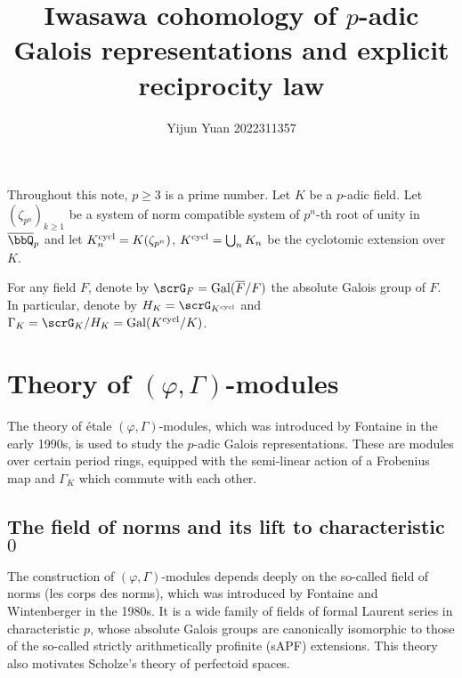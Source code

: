 \documentclass[a4paper,oneside]{amsart}
\title{Iwasawa cohomology of $p$-adic Galois representations and explicit reciprocity law}
\author{Yijun Yuan\textsuperscript{\orcidlink{0000-0001-6571-6980}} 2022311357}
\numberwithin{equation}{section}
\numberwithin{figure}{section}
\begin{document}
\maketitle
Throughout this note, $p\geq 3$ is a prime number. Let $K$ be a $p$-adic field. Let $(\zeta_{p^n})_{k\geq 1}$ be a system of norm compatible system of $p^n$-th root of unity in $\overline{\bbQ}_p$ and let $K_n^{\operatorname{cycl}}=K(\zeta_{p^n})$, $K^{\operatorname{cycl}}=\bigcup_n K_n$ be the cyclotomic extension over $K$.

For any field $F$, denote by $\scrG_F=\opn{Gal}(\overline{F}/F)$ the absolute Galois group of $F$. In particular, denote by $H_K=\scrG_{K^{\opn{cycl}}}$ and $\Gamma_K=\scrG_K/H_K=\opn{Gal}(K^{\opn{cycl}}/K)$.
\section{Theory of $(\varphi,\Gamma)$-modules}
The theory of \'etale $(\varphi,\Gamma)$-modules, which was introduced by Fontaine in the early 1990s, is used to study the $p$-adic Galois representations. These are modules over certain period rings, equipped with the semi-linear action of a Frobenius map and $\Gamma_K$ which commute with each other.

\subsection{The field of norms and its lift to characteristic $0$}
The construction of $(\varphi,\Gamma)$-modules depends deeply on the so-called field of norms (les corps des norms), which was introduced by Fontaine and Wintenberger in the 1980s. It is a wide family of fields of formal Laurent series in characteristic $p$, whose absolute Galois groups are canonically isomorphic to those of the so-called strictly arithmetically profinite (sAPF) extensions. This theory also motivates Scholze's theory of perfectoid spaces.
\end{document}
